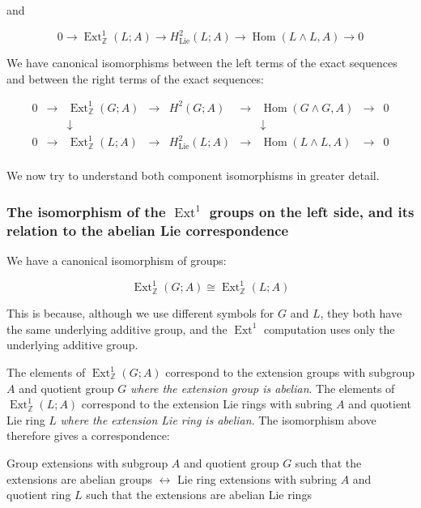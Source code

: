 \documentclass{ucetd}
\begin{document}
and

\begin{equation*}
0 \to \operatorname{Ext}^1_{\mathbb{Z}}(L;A) \to H^2_{\text{Lie}}(L;A) \to \operatorname{Hom}(L \wedge L, A) \to 0
\end{equation*}

We have canonical isomorphisms between the left terms of the exact
sequences and between the right terms of the exact sequences:

$$\begin{array}{ccccccccc}
  0 &\to &\operatorname{Ext}^1_{\mathbb{Z}}(G;A) &\to &H^2(G;A) &\to &\operatorname{Hom}(G \wedge G,A) &\to &0\\
  & & \downarrow & & & & \downarrow & & \\
  0 &\to &\operatorname{Ext}^1_{\mathbb{Z}}(L;A) & \to & H^2_{\text{Lie}}(L;A) & \to & \operatorname{Hom}(L \wedge L, A) & \to & 0\\
\end{array}$$

We now try to understand both component isomorphisms in greater
detail.

\subsubsection{The isomorphism of the $\operatorname{Ext}^1$ groups on the left side, and its relation to the abelian Lie correspondence}

We have a canonical isomorphism of groups:

$$\operatorname{Ext}^1_{\mathbb{Z}}(G;A) \cong \operatorname{Ext}^1_{\mathbb{Z}}(L;A)$$

This is because, although we use different symbols for $G$ and $L$,
they both have the same underlying additive group, and the
$\operatorname{Ext}^1$ computation uses only the underlying additive
group.

The elements of $\operatorname{Ext}^1_{\mathbb{Z}}(G;A)$ correspond to
the extension groups with subgroup $A$ and quotient group $G$ {\em
  where the extension group is abelian}. The elements of
$\operatorname{Ext}^1_{\mathbb{Z}}(L;A)$ correspond to the extension
Lie rings with subring $A$ and quotient Lie ring $L$ {\em where the
  extension Lie ring is abelian}. The isomorphism above therefore
gives a correspondence:

\begin{center}
Group extensions with subgroup $A$ and quotient group $G$ such that
the extensions are abelian groups $\leftrightarrow$ Lie ring
extensions with subring $A$ and quotient ring $L$ such that the
extensions are abelian Lie rings
\end{center}
\end{document}
